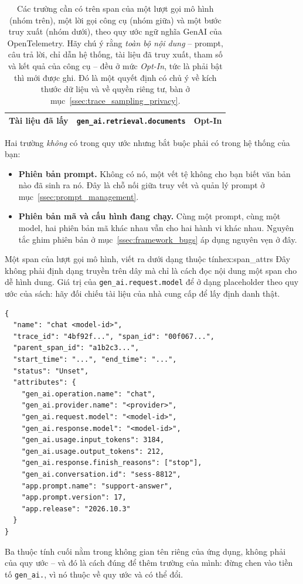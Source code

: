 \begin{table}[H]
\begin{tabular}{@{}lll@{}}
Tài liệu đã lấy & \texttt{gen\_\allowbreak ai.\allowbreak retrieval.\allowbreak documents} & Opt-In \\
\bottomrule
\end{tabular}
\caption{Các trường cần có trên span của một lượt gọi mô hình (nhóm trên), một lời gọi công cụ (nhóm giữa) và một bước truy xuất (nhóm dưới), theo quy ước ngữ nghĩa GenAI của OpenTelemetry. Hãy chú ý rằng \emph{toàn bộ nội dung} -- prompt, câu trả lời, chỉ dẫn hệ thống, tài liệu đã truy xuất, tham số và kết quả của công cụ -- đều ở mức \emph{Opt-In}, tức là phải bật thì mới được ghi. Đó là một quyết định có chủ ý về kích thước dữ liệu và về quyền riêng tư, bàn ở mục~\ref{ssec:trace_sampling_privacy}.}
\label{tab:llm_trace_fields}
\end{table}

\noindent Hai trường \emph{không} có trong quy ước nhưng bắt buộc phải có trong hệ thống của bạn:

\begin{itemize}
	\item \textbf{Phiên bản prompt.} Không có nó, một vết tệ không cho bạn biết văn bản nào đã sinh ra nó. Đây là chỗ nối giữa truy vết và quản lý prompt ở mục~\ref{ssec:prompt_management}.
	\item \textbf{Phiên bản mã và cấu hình đang chạy.} Cùng một prompt, cùng một model, hai phiên bản mã khác nhau vẫn cho hai hành vi khác nhau. Nguyên tắc ghim phiên bản ở mục~\ref{ssec:framework_bugs} áp dụng nguyên vẹn ở đây.
\end{itemize}

\begin{example}{Một span của lượt gọi mô hình, viết ra dưới dạng thuộc tính}{ex:span_attrs}
Đây không phải định dạng truyền trên dây mà chỉ là cách đọc nội dung một span cho dễ hình dung. Giá trị của \texttt{gen\_\allowbreak ai.\allowbreak request.\allowbreak model} để ở dạng placeholder theo quy ước của sách: hãy đối chiếu tài liệu của nhà cung cấp để lấy định danh thật.
\begin{verbatim}
{
  "name": "chat <model-id>",
  "trace_id": "4bf92f...", "span_id": "00f067...",
  "parent_span_id": "a1b2c3...",
  "start_time": "...", "end_time": "...",
  "status": "Unset",
  "attributes": {
    "gen_ai.operation.name": "chat",
    "gen_ai.provider.name": "<provider>",
    "gen_ai.request.model": "<model-id>",
    "gen_ai.response.model": "<model-id>",
    "gen_ai.usage.input_tokens": 3184,
    "gen_ai.usage.output_tokens": 212,
    "gen_ai.response.finish_reasons": ["stop"],
    "gen_ai.conversation.id": "sess-8812",
    "app.prompt.name": "support-answer",
    "app.prompt.version": 17,
    "app.release": "2026.10.3"
  }
}
\end{verbatim}
Ba thuộc tính cuối nằm trong không gian tên riêng của ứng dụng, không phải của quy ước -- và đó là cách đúng để thêm trường của mình: đừng chen vào tiền tố \texttt{gen\_ai.}, vì nó thuộc về quy ước và có thể đổi.
\end{example}


